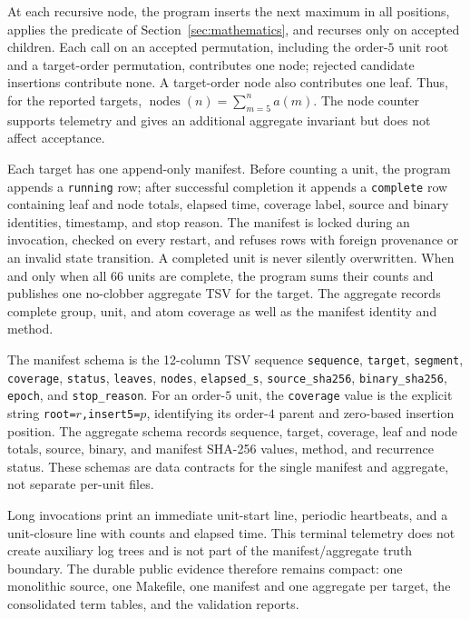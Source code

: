\documentclass[11pt]{article}
\theoremstyle{definition}
\theoremstyle{remark}
\begin{document}
At each recursive node, the program inserts the next maximum in all positions,
applies the predicate of Section~\ref{sec:mathematics}, and recurses only on
accepted children.  Each call on an accepted permutation, including the
order-$5$ unit root and a target-order permutation, contributes one node;
rejected candidate insertions contribute none.  A target-order node also
contributes one leaf.  Thus, for the reported targets,
$\operatorname{nodes}(n)=\sum_{m=5}^{n}a(m)$.  The node counter supports
telemetry and gives an additional aggregate invariant but does not affect
acceptance.

Each target has one append-only manifest.  Before counting a unit, the program
appends a \texttt{running} row; after successful completion it appends a
\texttt{complete} row containing leaf and node totals, elapsed time, coverage
label, source and binary identities, timestamp, and stop reason.  The manifest
is locked during an invocation, checked on every restart, and refuses rows
with foreign provenance or an invalid state transition.  A completed unit is
never silently overwritten.  When and only when all 66 units are complete,
the program sums their counts and publishes one no-clobber aggregate TSV for
the target.  The aggregate records complete group, unit, and atom coverage as
well as the manifest identity and method.

The manifest schema is the 12-column TSV sequence
\texttt{sequence}, \texttt{target}, \texttt{segment}, \texttt{coverage},
\texttt{status}, \texttt{leaves}, \texttt{nodes}, \texttt{elapsed\_s},
\texttt{source\_sha256}, \texttt{binary\_sha256}, \texttt{epoch}, and
\texttt{stop\_reason}.  For an order-$5$ unit, the \texttt{coverage} value is
the explicit string \texttt{root=$r$,insert5=$p$}, identifying its order-$4$
parent and zero-based insertion position.  The aggregate schema records
sequence, target, coverage, leaf and node totals, source, binary, and manifest
SHA-256 values, method, and recurrence status.  These schemas are data
contracts for the single manifest and aggregate, not separate per-unit files.

Long invocations print an immediate unit-start line, periodic heartbeats, and
a unit-closure line with counts and elapsed time.  This terminal telemetry
does not create auxiliary log trees and is not part of the manifest/aggregate
truth boundary.  The durable public evidence therefore remains compact: one
monolithic source, one Makefile, one manifest and one aggregate per target,
the consolidated term tables, and the validation reports.
\end{document}
